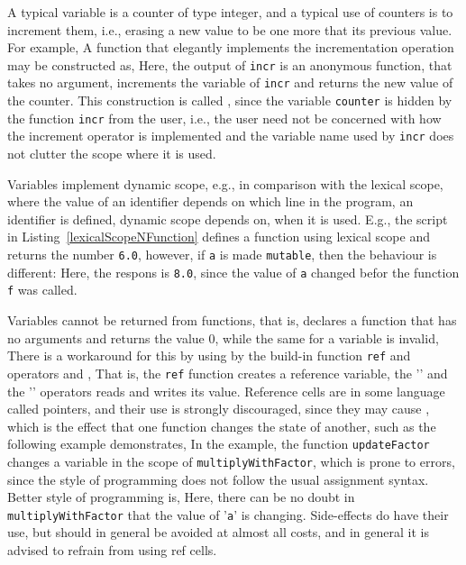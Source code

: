 A typical variable is a counter of type integer, and a typical use of counters is to increment them, i.e., erasing a new value to be one more that its previous value. For example,
%
%
A function that elegantly implements the incrementation operation may be constructed as,
%
%
 Here, the output of \texttt{incr} is an anonymous function, that takes no argument, increments the variable of \texttt{incr} and returns the new value of the counter. This construction is called , since the variable \texttt{counter} is hidden by the function \texttt{incr} from the user, i.e., the user need not be concerned with how the increment operator is implemented and the variable name used by \texttt{incr} does not clutter the scope where it is used.

Variables implement dynamic scope, e.g., in comparison with the lexical scope, where the value of an identifier depends on which line in the program, an identifier is defined, dynamic scope depends on, when it is used. E.g., the script in Listing~\ref{lexicalScopeNFunction} defines a function using lexical scope and returns the number \lstinline!6.0!, however, if \lstinline!a! is made \lstinline!mutable!, then the behaviour is different:
%
%
Here, the respons is \lstinline!8.0!, since the value of \lstinline!a! changed befor the function \lstinline!f! was called.
 
Variables cannot be returned from functions, that is,
%
%
declares a function that has no arguments and returns the value 0, while the same for a variable is invalid,
%
%
There is a workaround for this by using  by the build-in function \texttt{ref} and operators \lexeme{!} and \lexeme{:=},
%
%
That is, the \texttt{ref} function creates a reference variable, the '\lexeme{!}' and the '\lexeme{:=}' operators reads and writes its value. Reference cells are in some language called pointers, and their use is strongly discouraged, since they may cause , which is the effect that one function changes the state of another, such as the following example demonstrates,
%
%
In the example, the function \texttt{updateFactor} changes a variable in the scope of \texttt{multiplyWithFactor}, which is prone to errors, since the style of programming does not follow the usual assignment syntax. Better style of programming is,
%
%
Here, there can be no doubt in \texttt{multiplyWithFactor} that the value of '\texttt{a}' is changing. Side-effects do have their use, but should in general be avoided at almost all costs, and in general it is advised to refrain from using ref cells.


